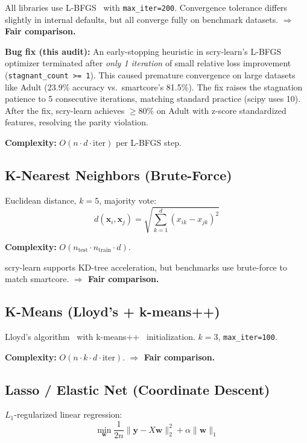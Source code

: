 \documentclass[11pt,a4paper]{article}
\begin{document}
All libraries use L-BFGS~\cite{nocedal1980} with
\texttt{max\_iter=200}. Convergence tolerance differs slightly in
internal defaults, but all converge fully on benchmark datasets.
\textbf{$\Rightarrow$ Fair comparison.}

\textbf{Bug fix (this audit):} An early-stopping heuristic in
scry-learn's L-BFGS optimizer terminated after \emph{only 1 iteration}
of small relative loss improvement (\texttt{stagnant\_count >= 1}).
This caused premature convergence on large datasets like Adult
(23.9\% accuracy vs.~smartcore's 81.5\%). The fix raises the
stagnation patience to 5 consecutive iterations, matching standard
practice (scipy uses 10). After the fix, scry-learn achieves
$\geq$80\% on Adult with z-score standardized features, resolving
the parity violation.

\textbf{Complexity:} $O(n \cdot d \cdot \text{iter})$ per L-BFGS step.

\subsection{K-Nearest Neighbors (Brute-Force)}

Euclidean distance, $k=5$, majority vote:
\[
d(\mathbf{x}_i, \mathbf{x}_j) = \sqrt{\sum_{k=1}^d (x_{ik} - x_{jk})^2}
\]

\textbf{Complexity:} $O(n_{\text{test}} \cdot n_{\text{train}} \cdot d)$.

scry-learn supports KD-tree acceleration, but benchmarks use
brute-force to match smartcore.
\textbf{$\Rightarrow$ Fair comparison.}

\subsection{K-Means (Lloyd's + k-means++)}

Lloyd's algorithm~\cite{lloyd1982} with k-means++~\cite{arthur2007}
initialization. $k=3$, \texttt{max\_iter=100}.

\textbf{Complexity:} $O(n \cdot k \cdot d \cdot \text{iter})$.
\textbf{$\Rightarrow$ Fair comparison.}

\subsection{Lasso / Elastic Net (Coordinate Descent)}

$L_1$-regularized linear regression:
\[
\min_{\mathbf{w}} \frac{1}{2n} \| \mathbf{y} - X\mathbf{w} \|_2^2
+ \alpha \| \mathbf{w} \|_1
\]
\end{document}
